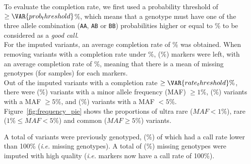 
To evaluate the completion rate, we first used a probability threshold of
$\geq \VAR{ prob_threshold }$\%, which means that a genotype must have one of
the three allele combination (\texttt{AA}, \texttt{AB} or \texttt{BB})
probabilities higher or equal to \% to be considered as a
\textit{good call}.\\

For the  imputed variants, an average completion rate of
\% was obtained. When removing variants with a
completion rate under \%, 
(\%) markers were left, with an average completion rate
of \%, meaning that there is a mean of
 missing genotypes (for  samples) for
each markers.\\

Out of the  imputed variants with a completion rate
$\geq \VAR{ rate_threshold }\%$, there were 
(\%) variants with a minor
allele frequency (MAF) $\geq 1\%$, 
(\%) variants with a MAF $\geq 5\%$, and
 (\%) variants with a MAF
$<5\%$.\\
 Figure~\ref{fig:frequency_pie} shows the proportions of ultra rare
($MAF<1\%$), rare ($1\%\leq MAF < 5\%$) and common ($MAF\geq 5\%$) variants.\\


A total of  variants were previously genotyped,
 (\%) of
which had  a call rate lower than 100\% (\textit{i.e.} 
missing genotypes). A total of 
(\%) missing genotypes were imputed with high
quality (\textit{i.e.}  markers now have a call
rate of 100\%).

